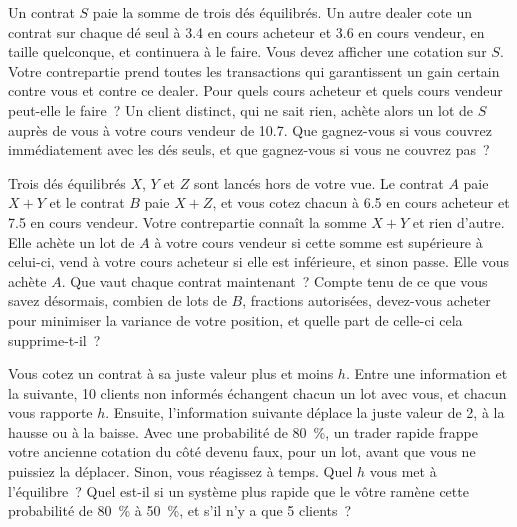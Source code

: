 \begin{question}\label{iq:iv2:making-a-market:18}
Un contrat $S$ paie la somme de trois dés équilibrés. Un autre dealer cote un contrat sur chaque dé seul à 3.4 en cours acheteur et 3.6 en cours vendeur, en taille quelconque, et continuera à le faire. Vous devez afficher une cotation sur $S$. Votre contrepartie prend toutes les transactions qui garantissent un gain certain contre vous et contre ce dealer. Pour quels cours acheteur et quels cours vendeur peut-elle le faire~? Un client distinct, qui ne sait rien, achète alors un lot de $S$ auprès de vous à votre cours vendeur de 10.7. Que gagnez-vous si vous couvrez immédiatement avec les dés seuls, et que gagnez-vous si vous ne couvrez pas~?
\end{question}

\begin{question}\label{iq:iv2:making-a-market:19}
Trois dés équilibrés $X$, $Y$ et $Z$ sont lancés hors de votre vue. Le contrat $A$ paie $X + Y$ et le contrat $B$ paie $X + Z$, et vous cotez chacun à 6.5 en cours acheteur et 7.5 en cours vendeur. Votre contrepartie connaît la somme $X + Y$ et rien d'autre. Elle achète un lot de $A$ à votre cours vendeur si cette somme est supérieure à celui-ci, vend à votre cours acheteur si elle est inférieure, et sinon passe. Elle vous achète $A$. Que vaut chaque contrat maintenant~? Compte tenu de ce que vous savez désormais, combien de lots de $B$, fractions autorisées, devez-vous acheter pour minimiser la variance de votre position, et quelle part de celle-ci cela supprime-t-il~?
\end{question}

\begin{question}\label{iq:iv2:making-a-market:20}
Vous cotez un contrat à sa juste valeur plus et moins $h$. Entre une information et la suivante, 10 clients non informés échangent chacun un lot avec vous, et chacun vous rapporte $h$. Ensuite, l'information suivante déplace la juste valeur de 2, à la hausse ou à la baisse. Avec une probabilité de 80~\%, un trader rapide frappe votre ancienne cotation du côté devenu faux, pour un lot, avant que vous ne puissiez la déplacer. Sinon, vous réagissez à temps. Quel $h$ vous met à l'équilibre~? Quel est-il si un système plus rapide que le vôtre ramène cette probabilité de 80~\% à 50~\%, et s'il n'y a que 5 clients~?
\end{question}

